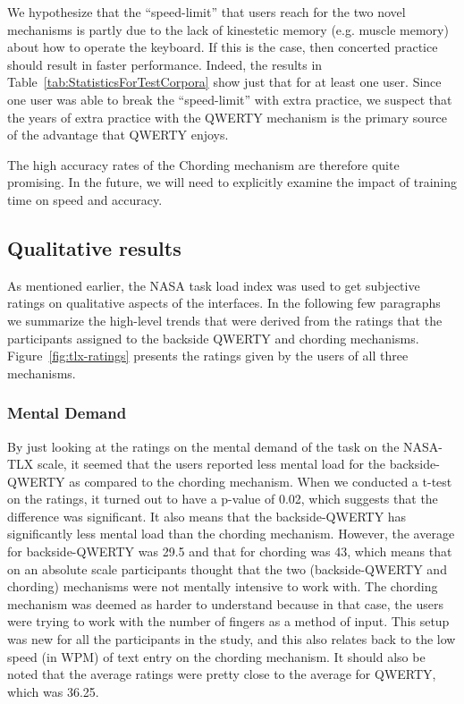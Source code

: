 We hypothesize that the ``speed-limit'' that users reach for the two
novel mechanisms is partly due to the lack of kinestetic memory
(e.g. muscle memory) about how to operate the keyboard.  If this is
the case, then concerted practice should result in faster performance.
Indeed, the results in Table~\ref{tab:StatisticsForTestCorpora} show
just that for at least one user.  Since one user was able to break the
``speed-limit'' with extra practice, we suspect that the years of
extra practice with the QWERTY mechanism is the primary source of the
advantage that QWERTY enjoys.

The high accuracy rates of the Chording mechanism are therefore quite
promising.  In the future, we will need to explicitly examine the
impact of training time on speed and accuracy.

\subsection{Qualitative results}

As mentioned earlier, the NASA task load index was used to get
subjective ratings on qualitative aspects of the interfaces. In the following few paragraphs we summarize the
high-level trends that were derived from the ratings that the
participants assigned to the backside QWERTY and chording
mechanisms. Figure~\ref{fig:tlx-ratings} presents the ratings given by
the users of all three mechanisms.

\subsubsection{Mental Demand}

By just looking at the ratings on the mental demand of the task on the
NASA-TLX scale, it seemed that the users reported less mental load for
the backside-QWERTY as compared to the chording mechanism. When we
conducted a t-test on the ratings, it turned out to have a p-value of
0.02, which suggests that the difference was significant. It also
means that the backside-QWERTY has significantly less mental load than
the chording mechanism. However, the average for backside-QWERTY was
29.5 and that for chording was 43, which means that on an absolute
scale participants thought that the two (backside-QWERTY and chording) mechanisms were not mentally
intensive to work with. The chording mechanism was deemed as harder to
understand because in that case, the users were trying to work with
the number of fingers as a method of input. This setup was new for all
the participants in the study, and this also relates back to the low
speed (in WPM) of text entry on the chording mechanism. It should also be noted that the average ratings were pretty close to the average for QWERTY, which was 36.25.

